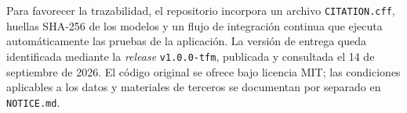 Para favorecer la trazabilidad, el repositorio incorpora un archivo
\texttt{CITATION.cff}, huellas SHA-256 de los modelos y un flujo de integración
continua que ejecuta automáticamente las pruebas de la aplicación. La versión
de entrega queda identificada mediante la \emph{release} \texttt{v1.0.0-tfm},
publicada y consultada el 14 de septiembre de 2026. El código original se ofrece
bajo licencia MIT; las condiciones aplicables a los datos y materiales de
terceros se documentan por separado en \texttt{NOTICE.md}.
